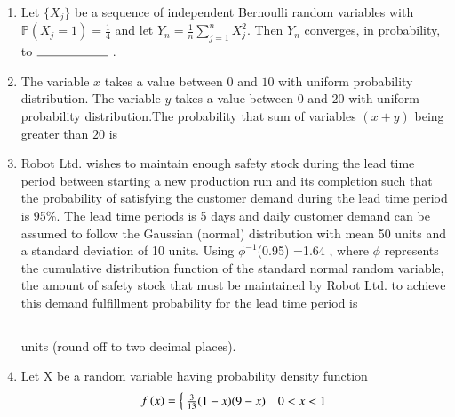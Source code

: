\documentclass[journal,12pt,twocolumn]{IEEEtran}
\begin{document}
\begin{enumerate}
%
\item Let $\{X_j\}$ be a sequence of independent Bernoulli random variables with $\mathbb{P}(X_j=1) = \frac{1}{4}$ and let $Y_n = \frac{1}{n} \sum_{j=1}^{n}X_j^2$. Then $Y_n$ converges, in probability, to $\rule{2cm}{0.15mm}$ .
\solution
  
%
\item The variable $x$ takes a value between $0$ and $10$ with uniform probability distribution. The variable $y$ takes a value between $0$ and $20$ with uniform probability distribution.The probability that sum of variables $(x+y)$ being greater than $20$ is
%
\item Robot Ltd. wishes to maintain enough safety
stock during the lead time period between
starting a new production run and its completion
such that the probability of satisfying the
customer demand during the lead time period
is 95\%. The lead time periods is 5 days and
daily customer demand can be assumed to follow
the Gaussian (normal) distribution with mean
50 units and a standard deviation of 10 units.
Using $\phi^{-1}$(0.95) =1.64 , where $\phi$ represents the
cumulative distribution function of the standard
normal random variable, the amount of safety
stock that must be maintained by Robot Ltd. to
achieve this demand fulfillment probability for
the lead time period is \rule{1cm}{0.15mm}  units (round off to
two decimal places).
%
\solution
  
%
%   
\item Let X be a random variable having probability density function 
\begin{align}
\label{st2021-22:eq:qpdf_X}
f\left(x\right) = 
\begin{cases}
\frac{3}{13}(1-x)(9-x) & 0 < x < 1

\end{cases}
\end{align}
\end{enumerate}
\end{document}
